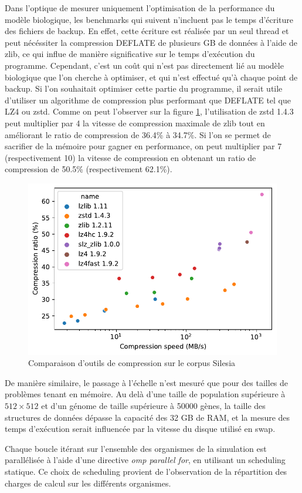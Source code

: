 \documentclass[a4paper, 10pt, twoside]{article}
\begin{document}
Dans l'optique de mesurer uniquement l'optimisation de la performance du modèle biologique, les benchmarks qui suivent n'incluent pas le temps d'écriture des fichiers de backup. En effet, cette écriture est réalisée par un seul thread et peut nécéssiter la compression DEFLATE de plusieurs GB de données à l'aide de zlib, ce qui influe de manière significative sur le temps d'exécution du programme. Cependant, c'est un coût qui n'est pas directement lié au modèle biologique que l'on cherche à optimiser, et qui n'est effectué qu'à chaque point de backup. Si l'on souhaitait optimiser cette partie du programme, il serait utile d'utiliser un algorithme de compression plus performant que DEFLATE tel que LZ4 ou zstd. Comme on peut l'observer sur la figure \ref{fig:compression/tools}, l'utilisation de zstd 1.4.3 peut multiplier par 4 la vitesse de compression maximale de zlib tout en améliorant le ratio de compression de 36.4\% à 34.7\%. Si l'on se permet de sacrifier de la mémoire pour gagner en performance, on peut multiplier par 7 (respectivement 10) la vitesse de compression en obtenant un ratio de compression de 50.5\% (respectivement 62.1\%).

\begin{figure}[htbp]
	\centering
	\includegraphics[width=0.5\linewidth]{img/compression_tools.pdf}
	\caption{Comparaison d'outils de compression sur le corpus Silesia \cite{lzbench}}
	\label{fig:compression/tools}
\end{figure}

De manière similaire, le passage à l'échelle n'est mesuré que pour des tailles de problèmes tenant en mémoire. Au delà d'une taille de population supérieure à $512 \times 512$ et d'un génome de taille supérieure à 50000 gènes, la taille des structures de données dépasse la capacité des 32 GB de RAM, et la mesure des temps d'exécution serait influencée par la vitesse du disque utilisé en swap.

Chaque boucle itérant sur l'ensemble des organismes de la simulation est parallélisée à l'aide d'une directive \textit{omp parallel for}, en utilisant un scheduling statique. Ce choix de scheduling provient de l'observation de la répartition des charges de calcul sur les différents organismes.
\end{document}

